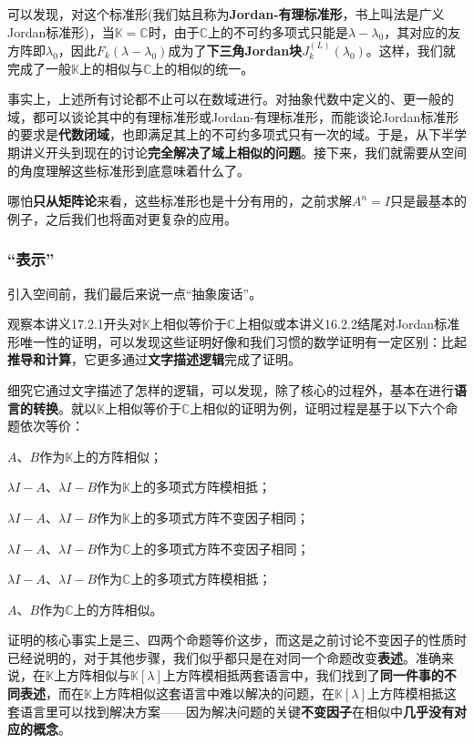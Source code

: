 \documentclass[a4paper,UTF8,fontset=windows,AutoFakeBold]{ctexart}
\newcommand*{\note}{\noindent *}
\begin{document}
可以发现，对这个标准形(我们姑且称为\textbf{Jordan-有理标准形}，书上叫法是广义Jordan标准形)，当$\mathbb{K}=\mathbb{C}$时，由于$\mathbb{C}$上的不可约多项式只能是$\lambda-\lambda_0$，其对应的友方阵即$\lambda_0$，因此$F_k(\lambda-\lambda_0)$成为了\textbf{下三角Jordan块}$J_k^{(L)}(\lambda_0)$。这样，我们就完成了一般$\mathbb{K}$上的相似与$\mathbb{C}$上的相似的统一。

\note 事实上，上述所有讨论都不止可以在数域进行。对抽象代数中定义的、更一般的域，都可以谈论其中的有理标准形或Jordan-有理标准形，而能谈论Jordan标准形的要求是\textbf{代数闭域}，也即满足其上的不可约多项式只有一次的域。于是，从下半学期讲义开头到现在的讨论\textbf{完全解决了域上相似的问题}。接下来，我们就需要从空间的角度理解这些标准形到底意味着什么了。

\note 哪怕\textbf{只从矩阵论}来看，这些标准形也是十分有用的，之前求解$A^n=I$只是最基本的例子，之后我们也将面对更复杂的应用。

\subsubsection{``表示''}
引入空间前，我们最后来说一点``抽象废话''。

观察本讲义17.2.1开头对$\mathbb{K}$上相似等价于$\mathbb{C}$上相似或本讲义16.2.2结尾对Jordan标准形唯一性的证明，可以发现这些证明好像和我们习惯的数学证明有一定区别：比起\textbf{推导和计算}，它更多通过\textbf{文字描述逻辑}完成了证明。

细究它通过文字描述了怎样的逻辑，可以发现，除了核心的过程外，基本在进行\textbf{语言的转换}。就以$\mathbb{K}$上相似等价于$\mathbb{C}$上相似的证明为例，证明过程是基于以下六个命题依次等价：
\begin{compactitem}
    \item $A$、$B$作为$\mathbb{K}$上的方阵相似；
    \item $\lambda I-A$、$\lambda I-B$作为$\mathbb{K}$上的多项式方阵模相抵；
    \item $\lambda I-A$、$\lambda I-B$作为$\mathbb{K}$上的多项式方阵不变因子相同；
    \item $\lambda I-A$、$\lambda I-B$作为$\mathbb{C}$上的多项式方阵不变因子相同；
    \item $\lambda I-A$、$\lambda I-B$作为$\mathbb{C}$上的多项式方阵模相抵；
    \item $A$、$B$作为$\mathbb{C}$上的方阵相似。
\end{compactitem}

证明的核心事实上是三、四两个命题等价这步，而这是之前讨论不变因子的性质时已经说明的，对于其他步骤，我们似乎都只是在对同一个命题改变\textbf{表述}。准确来说，在$\mathbb{K}$上方阵相似与$\mathbb{K}[\lambda]$上方阵模相抵两套语言中，我们找到了\textbf{同一件事的不同表述}，而在$\mathbb{K}$上方阵相似这套语言中难以解决的问题，在$\mathbb{K}[\lambda]$上方阵模相抵这套语言里可以找到解决方案——因为解决问题的关键\textbf{不变因子}在相似中\textbf{几乎没有对应的概念}。
\end{document}
